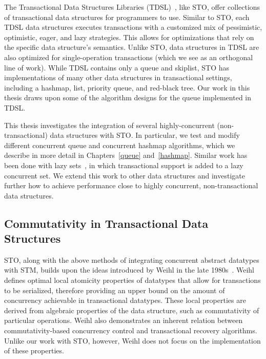 The Transactional Data Structures Libraries (TDSL)~\cite{tdsl}, like STO, offer collections of transactional data structures for programmers to use. Similar to STO, each TDSL data structures executes transactions with a customized mix of pessimistic, optimistic, eager, and lazy strategies.
This allows for optimizations that rely on the specific data structure's semantics. Unlike STO, data structures in TDSL are also optimized for single-operation transactions (which we see as an orthogonal line of work). While TDSL contains only a queue and skiplist, STO has implementations of many other data structures in transactional settings, including a hashmap, list, priority queue, and red-black tree. Our work in this thesis draws upon some of the algorithm designs for the queue implemented in TDSL.

This thesis investigates the integration of several highly-concurrent (non-transactional) data structures with STO. In particular, we test and modify different concurrent queue and concurrent hashmap algorithms, which we describe in more detail in Chapters~\ref{queue} and~\ref{hashmap}. Similar work has been done with lazy sets~\cite{lazyset}, in which transactional support is added to a lazy concurrent set. We extend this work to other data structures and investigate further how to achieve performance close to highly concurrent, non-transactional data structures.

\subsection{Commutativity in Transactional Data Structures}

STO, along with the above methods of integrating concurrent abstract datatypes with STM, builds upon the ideas introduced by Weihl in the late 1980s~\cite{weihl}. Weihl defines optimal local atomicity properties of datatypes that allow for transactions to be serialized, therefore providing an upper bound on the amount of concurrency achievable in transactional datatypes. These local properties are derived from algebraic properties of the data structure, such as commutativity of particular operations. Weihl also demonstrates an inherent relation between commutativity-based concurrency control and transactional recovery algorithms. Unlike our work with STO, however, Weihl does not focus on the implementation of these properties.

